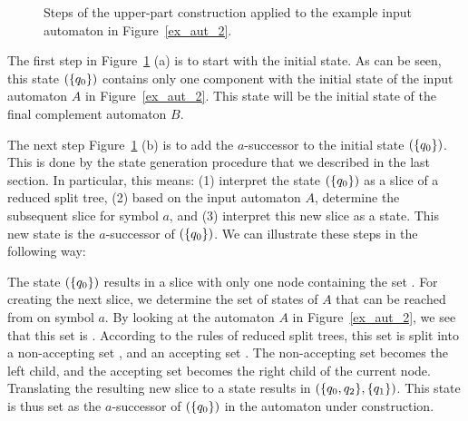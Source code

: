 \begin{figure}[htb]
\centering
  \begin{subfigure}[t]{0.49\textwidth}
  \centering
  \UpperPartA
  \caption{}
  \end{subfigure}
  \hfill
  \begin{subfigure}[t]{0.49\textwidth}
  \centering
  \UpperPartB
  \caption{}
  \end{subfigure}

  \begin{subfigure}[t]{0.49\textwidth}
  \centering
  \UpperPartC
  \caption{}
  \end{subfigure}
  \hfill
  \begin{subfigure}[t]{0.49\textwidth}
  \centering
  \UpperPartD
  \caption{}
  \end{subfigure}
\caption{Steps of the upper-part construction applied to the example input automaton in Figure~\ref{ex_aut_2}.}
\label{steps_upper}
\end{figure}

The first step in Figure~\ref{steps_upper} (a) is to start with the initial state. As can be seen, this state $(\{q_{0}\})$ contains only one component with the initial state of the input automaton $A$ in Figure~\ref{ex_aut_2}. This state will be the initial state of the final complement automaton $B$.

The next step Figure~\ref{steps_upper} (b) is to add the $a$-successor to the initial state $(\{q_{0}\})$. This is done by the state generation procedure that we described in the last section. In particular, this means: (1) interpret the state $(\{q_{0}\})$ as a slice of a reduced split tree, (2) based on the input automaton $A$, determine the subsequent slice for symbol $a$, and (3) interpret this new slice as a state. This new state is the $a$-successor of $(\{q_{0}\})$. We can illustrate these steps in the following way:

\begin{center}
\SlicesOne
\end{center}

The state $(\{q_{0}\})$ results in a slice with only one node containing the set . For creating the next slice, we determine the set of states of $A$ that can be reached from  on symbol $a$. By looking at the automaton $A$ in Figure~\ref{ex_aut_2}, we see that this set is . According to the rules of reduced split trees, this set is split into a non-accepting set , and an accepting set . The non-accepting set  becomes the left child, and the accepting set  becomes the right child of the current node. Translating the resulting new slice to a state results in $(\{q_{0},q_{2}\}, \{q_{1}\})$. This state is thus set as the $a$-successor of $(\{q_{0}\})$ in the automaton under construction.

